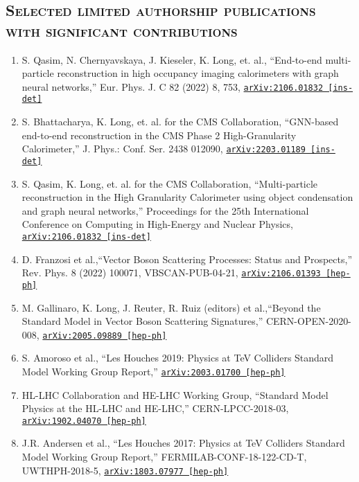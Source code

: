 \documentclass[10pt]{res} %
\begin{document}
\begin{resume}
\section{\textsc{Selected limited authorship publications with significant contributions}}
\begin{enumerate}\addtocounter{enumi}{10}
  \item S. Qasim, N. Chernyavskaya, J. Kieseler, K. Long, et. al., ``End-to-end multi-particle reconstruction in high occupancy imaging calorimeters with graph neural networks,'' 
    Eur. Phys. J. C 82 (2022) 8, 753, \href{https://arxiv.org/abs/2106.01832}{\texttt{arXiv:2106.01832 [ins-det]}}
  \item S. Bhattacharya, K. Long, et. al. for the CMS Collaboration, ``GNN-based end-to-end reconstruction in the CMS Phase 2 High-Granularity Calorimeter,'' J. Phys.: Conf. Ser. 2438 012090, \href{https://arxiv.org/abs/2203.01189}{\texttt{arXiv:2203.01189 [ins-det]}} 
  \item S. Qasim, K. Long, et. al. for the CMS Collaboration, ``Multi-particle reconstruction in the High Granularity Calorimeter using object condensation and graph neural networks,'' Proceedings for the 25th International Conference on Computing in High-Energy and Nuclear Physics, \href{https://arxiv.org/abs/2106.01832}{\texttt{arXiv:2106.01832 [ins-det]}} 
  \item D. Franzosi et al.,``Vector Boson Scattering Processes: Status and Prospects,''
    Rev. Phys. 8 (2022) 100071, VBSCAN-PUB-04-21, \href{https://arxiv.org/abs/2106.01393}{\texttt{arXiv:2106.01393 [hep-ph]}}
  \item M. Gallinaro, K. Long, J. Reuter, R. Ruiz (editors) et al.,``Beyond the Standard Model in Vector Boson Scattering Signatures,''
    CERN-OPEN-2020-008, \href{https://arxiv.org/abs/2005.09889}{\texttt{arXiv:2005.09889 [hep-ph]}}
  \item S. Amoroso et al., ``Les Houches 2019: Physics at TeV Colliders Standard Model Working Group Report,''
    \href{https://arxiv.org/abs/2003.01700 } {\texttt{arXiv:2003.01700 [hep-ph]}}
  \item HL-LHC Collaboration and HE-LHC Working Group, ``Standard Model Physics at the HL-LHC and HE-LHC,''
    CERN-LPCC-2018-03, \href{https://arxiv.org/abs/1902.04070}{\texttt{arXiv:1902.04070 [hep-ph]}}
  \item J.R. Andersen et al., ``Les Houches 2017: Physics at TeV Colliders Standard Model Working Group Report,''
    FERMILAB-CONF-18-122-CD-T, UWTHPH-2018-5, \href{https://arxiv.org/abs/1803.07977}{\texttt{arXiv:1803.07977 [hep-ph]}}
\end{enumerate}


\end{resume}
\end{document}

